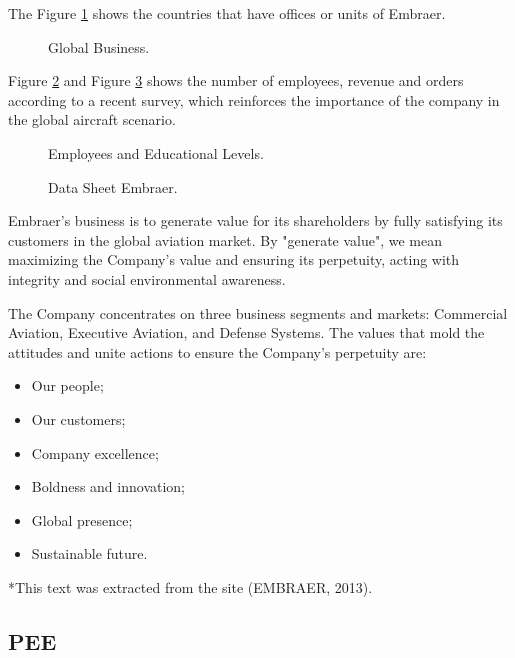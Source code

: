 The Figure \ref{fig:EmbraerGlobalBusiness} shows the countries that have offices or units of Embraer.

\begin{figure}[H] %
\caption{Global Business.}
\label{fig:EmbraerGlobalBusiness}
\end{figure}

Figure \ref{fig:EmployeesAndEducationalLevels} and Figure \ref{fig:DataSheetEmbraer} shows the number of employees, revenue and orders
according to a recent survey, which reinforces the importance of the company in the
global aircraft scenario.

\begin{figure}[H] %
\caption{Employees and Educational Levels.}
\label{fig:EmployeesAndEducationalLevels}
\end{figure}


\begin{figure}[H] %
\caption{Data Sheet Embraer.}
\label{fig:DataSheetEmbraer}
\end{figure}

Embraer's business is to generate value for its shareholders by fully satisfying its
customers in the global aviation market. By "generate value", we mean maximizing the
Company's value and ensuring its perpetuity, acting with integrity and social
environmental awareness.

The Company concentrates on three business segments and markets:
Commercial Aviation, Executive Aviation, and Defense Systems. The values that mold
the attitudes and unite actions to ensure the Company's perpetuity are:

\begin{itemize}
  \item Our people;
  \item Our customers;
  \item Company excellence;
  \item Boldness and innovation;
  \item Global presence;
  \item Sustainable future.
\end{itemize}
*This text was extracted from the site (EMBRAER, 2013).

\subsection{PEE}

